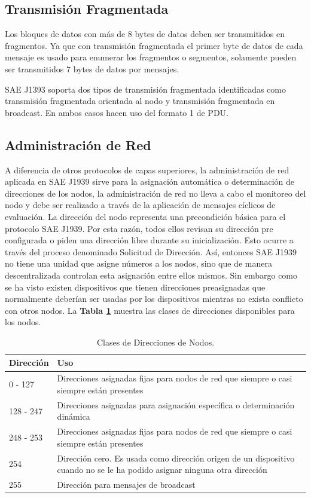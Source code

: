 \subsection{Transmisión Fragmentada} 
Los bloques de datos con más de 8 bytes de datos deben ser transmitidos en fragmentos. Ya que con transmisión fragmentada el primer byte de datos de cada mensaje es usado para enumerar los fragmentos o segmentos, solamente pueden ser transmitidos 7 bytes de datos por mensajes.

SAE J1393 soporta dos tipos de transmisión fragmentada identificadas como transmisión fragmentada orientada al nodo y transmisión fragmentada en broadcast. En ambos casos hacen uso del formato 1 de PDU.

\subsection{Administración de Red}
A diferencia de otros protocolos de capas superiores, la administración de red aplicada en SAE J1939 sirve para la asignación automática o determinación de direcciones de los nodos, la administración de red no lleva a cabo el monitoreo del nodo y debe ser realizado a través de la aplicación de mensajes cíclicos de evaluación.
La dirección del nodo representa una precondición básica para el protocolo SAE J1939. Por esta razón, todos ellos revisan su dirección pre configurada o piden una dirección libre durante su inicialización.  Esto ocurre a través del proceso denominado Solicitud de Dirección. Así, entonces SAE J1939 no tiene una unidad que asigne números a los nodos, sino que de manera descentralizada controlan esta asignación entre ellos mismos.
Sin embargo como se ha visto existen dispositivos que tienen direcciones preasignadas que normalmente deberían ser usadas por los dispositivos mientras no exista conflicto con otros nodos. La \textbf{Tabla \ref{nodos}} muestra las clases de direcciones disponibles para los nodos. 


\begin{table}[htb]
\begin{center}
\begin{tabular} {p{2cm} p{9cm}}%
\toprule
Dirección & Uso  \\
\midrule
0 - 127 & Direcciones asignadas fijas para nodos de red que siempre o casi siempre están presentes \\ 
128 - 247 & Direcciones asignadas para asignación específica o determinación dinámica \\ 
248 - 253 & Direcciones asignadas fijas para nodos de red que siempre o casi siempre están presentes \\ 
254 & Dirección cero. Es usada como dirección origen de un dispositivo cuando no se le ha podido asignar ninguna otra dirección \\
255 & Dirección para mensajes de broadcast \\ %
\bottomrule
\end{tabular}
\caption{Clases de Direcciones de Nodos.}
\label{nodos}
\end{center}
\end{table}

